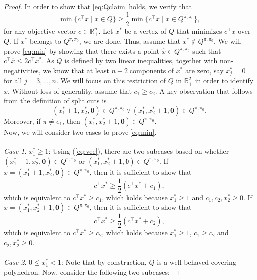 \documentclass[11pt]{article}
\newcommand{\R}{\mathbb{R}}
\newcommand{\zeros}{\boldsymbol{0}}
\newcommand{\cred}{\color{black}}
\begin{document}
\begin{proof}
In order to show that \eqref{eq:Qclaim} holds, we verify that 
\begin{equation}
\label{eq:min}
\min \{ c^\top x \mid x \in Q\} \geq \frac{1}{2} \min \{ c^\top x \mid x \in Q^{\pi,\pi_0} \},
\end{equation}
for any objective vector $c \in \R_+^n$. Let $x^*$ be a vertex of $Q$ that minimizes $c^\top x$ over $Q$. If $x^*$ belongs to $Q^{\pi,\pi_0}$, we are done. Thus, assume that $x^* \notin Q^{\pi,\pi_0}$. We will prove \eqref{eq:min} by showing that there exists a point $\hat{x} \in Q^{\pi,\pi_0}$ such that $c^\top \hat{x} \leq 2 c^\top x^*$. As $Q$ is defined by two linear inequalities, together with non-negativities, we know that at least $n-2$ components of $x^*$ are zero, say $x^*_j = 0$ for all $j=3,\hdots,n$. We will focus on this restriction of $Q$ in $\R_+^2$ in order to identify $\hat{x}$. Without loss of generality, assume that $c_1 \geq c_2$. A key observation that follows from the definition of split cuts is
\begin{equation}
\label{eq:vee}
(x^*_1+1,x^*_2,\zeros) \in Q^{\pi,\pi_0} \vee (x^*_1,x^*_2+1,\zeros) \in Q^{\pi,\pi_0}.
\end{equation} {\cred Moreover, if $\pi \neq e_1$, then $(x^*_1,x^*_2+1,\zeros) \in Q^{\pi,\pi_0}.$\\}
Now, we will consider two cases to prove \eqref{eq:min}.
\\ \\
\emph{Case 1}. $x^*_1 \geq 1$:  %
{\cred Using (\ref{eq:vee}), there are two subcases based on whether $(x^*_1+1,x^*_2,\zeros) \in Q^{\pi,\pi_0} $ or $ (x^*_1,x^*_2+1,\zeros) \in Q^{\pi,\pi_0}$. If $\hat{x} = (x^*_1+1,x^*_2,\zeros) \in Q^{\pi,\pi_0}$, then it is sufficient to show that 
$$c^\top x^* \geq \frac{1}{2} (c^\top x^* + c_1),$$
which is equivalent to $c^\top x^* \geq  c_1$, which holds because $x^*_1 \geq 1$ and $c_1, c_2, x^*_2 \geq 0$. If $\hat{x} = (x^*_1,x^*_2 + 1,\zeros) \in Q^{\pi,\pi_0}$, then it is sufficient to show that 
$$c^\top x^* \geq \frac{1}{2} (c^\top x^* + c_2),$$
which is equivalent to $c^\top x^* \geq  c_2$, which holds because $x^*_1 \geq 1$, $c_1 \geq c_2$ and $c_2, x^*_2 \geq 0$. }
 \\ \\
\emph{Case 2}. $0 \leq x^*_1 < 1$: Note that by construction, $Q$ is a well-behaved covering polyhedron. Now, consider the following two subcases:

\end{proof}
\end{document}

